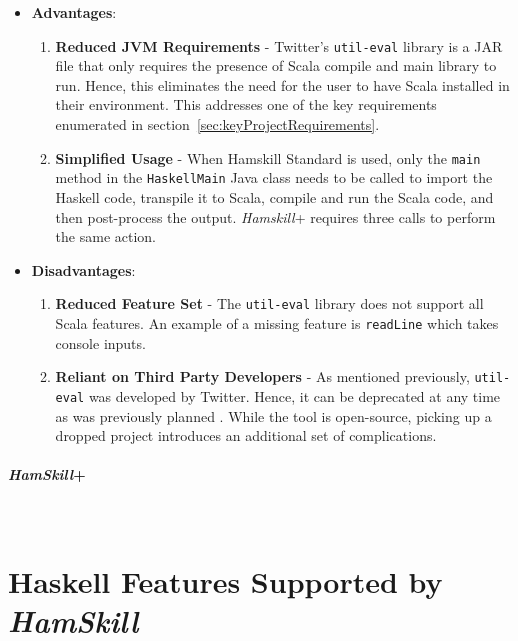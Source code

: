 \documentclass{report}
\newcommand{\myparagraph}[1]{\paragraph{#1}\mbox{}\\}
\begin{document}
\begin{itemize}

\item \textbf{Advantages}:

\begin{enumerate}

\item \textbf{Reduced JVM Requirements} - Twitter's \texttt{util-eval} library is a JAR file that only requires the presence of Scala compile and main library to run.  Hence, this eliminates the need for the user to have Scala installed in their environment.  This addresses one of the key requirements enumerated in section~\ref{sec:keyProjectRequirements}.

\item \textbf{Simplified Usage} - When Hamskill Standard is used, only the \texttt{main} method in the \texttt{HaskellMain} Java class needs to be called to import the Haskell code, transpile it to Scala, compile and run the Scala code, and then post-process the output.  \textit{Hamskill}+ requires three calls to perform the same action.

\end{enumerate}

\item \textbf{Disadvantages}:

\begin{enumerate}

\item \textbf{Reduced Feature Set} - The \texttt{util-eval} library does not support all Scala features.  An example of a missing feature is \texttt{readLine} which takes console inputs.

\item \textbf{Reliant on Third Party Developers} - As mentioned previously, \texttt{util-eval} was developed by Twitter.  Hence, it can be deprecated at any time as was previously planned \cite{deprecateUtilEval}.  While the tool is open-source, picking up a dropped project introduces an additional set of complications.

\end{enumerate}

\end{itemize}

\myparagraph{\textit{HamSkill}+}

\section{Haskell Features Supported by \textit{HamSkill}}\label{sec:hamskillFeatures}
\end{document}
